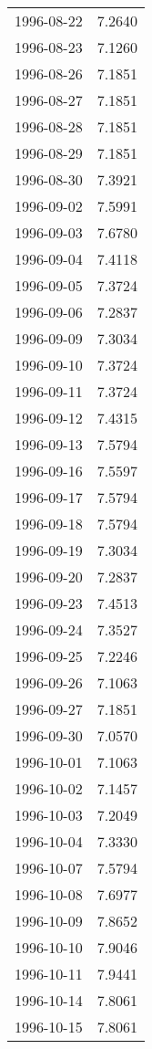 \begin{tabular}{lr}
1996-08-22 &      7.2640 \\
1996-08-23 &      7.1260 \\
1996-08-26 &      7.1851 \\
1996-08-27 &      7.1851 \\
1996-08-28 &      7.1851 \\
1996-08-29 &      7.1851 \\
1996-08-30 &      7.3921 \\
1996-09-02 &      7.5991 \\
1996-09-03 &      7.6780 \\
1996-09-04 &      7.4118 \\
1996-09-05 &      7.3724 \\
1996-09-06 &      7.2837 \\
1996-09-09 &      7.3034 \\
1996-09-10 &      7.3724 \\
1996-09-11 &      7.3724 \\
1996-09-12 &      7.4315 \\
1996-09-13 &      7.5794 \\
1996-09-16 &      7.5597 \\
1996-09-17 &      7.5794 \\
1996-09-18 &      7.5794 \\
1996-09-19 &      7.3034 \\
1996-09-20 &      7.2837 \\
1996-09-23 &      7.4513 \\
1996-09-24 &      7.3527 \\
1996-09-25 &      7.2246 \\
1996-09-26 &      7.1063 \\
1996-09-27 &      7.1851 \\
1996-09-30 &      7.0570 \\
1996-10-01 &      7.1063 \\
1996-10-02 &      7.1457 \\
1996-10-03 &      7.2049 \\
1996-10-04 &      7.3330 \\
1996-10-07 &      7.5794 \\
1996-10-08 &      7.6977 \\
1996-10-09 &      7.8652 \\
1996-10-10 &      7.9046 \\
1996-10-11 &      7.9441 \\
1996-10-14 &      7.8061 \\
1996-10-15 &      7.8061 \\

\end{tabular}
